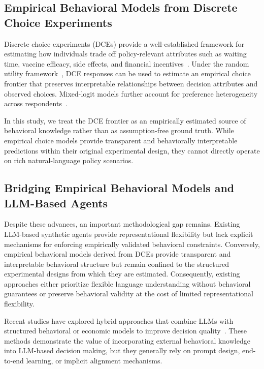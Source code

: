 \documentclass[11pt]{article}
\begin{document}
\subsection{Empirical Behavioral Models from Discrete Choice Experiments}

Discrete choice experiments (DCEs) provide a well-established framework for estimating how individuals trade off policy-relevant attributes such as waiting time, vaccine efficacy, side effects, and financial incentives~\citep{soekhai2019discrete, chan2024vaccine}. Under the random utility framework~\citep{train2009discrete, louviere2000stated}, DCE responses can be used to estimate an empirical choice frontier that preserves interpretable relationships between decision attributes and observed choices. Mixed-logit models further account for preference heterogeneity across respondents~\citep{hensher2003mixed, hensher2015applied}.

In this study, we treat the DCE frontier as an empirically estimated source of behavioral knowledge rather than as assumption-free ground truth. While empirical choice models provide transparent and behaviorally interpretable predictions within their original experimental design, they cannot directly operate on rich natural-language policy scenarios.

\subsection{Bridging Empirical Behavioral Models and LLM-Based Agents}

Despite these advances, an important methodological gap remains. Existing LLM-based synthetic agents provide representational flexibility but lack explicit mechanisms for enforcing empirically validated behavioral constraints\citep{li2026position, tornberg2025validation}. Conversely, empirical behavioral models derived from DCEs provide transparent and interpretable behavioral structure but remain confined to the structured experimental designs from which they are estimated. Consequently, existing approaches either prioritize flexible language understanding without behavioral guarantees or preserve behavioral validity at the cost of limited representational flexibility.

Recent studies have explored hybrid approaches that combine LLMs with structured behavioral or economic models to improve decision quality~\citep{sfeir2025assist, zhang2026agentic}. These methods demonstrate the value of incorporating external behavioral knowledge into LLM-based decision making, but they generally rely on prompt design, end-to-end learning, or implicit alignment mechanisms.
\end{document}
